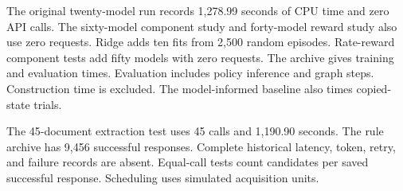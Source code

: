 \label{app:runtime_details}

The original twenty-model run records 1,278.99 seconds of CPU time and
zero API calls. The sixty-model component study and forty-model reward
study also use zero requests. Ridge adds ten fits from 2,500 random
episodes. Rate-reward component tests add fifty models with zero requests.
The archive gives training and evaluation times. Evaluation includes
policy inference and graph steps. Construction time is excluded.
The model-informed baseline also times copied-state trials.

The 45-document extraction test uses 45 calls and 1,190.90 seconds.
The rule archive has 9,456 successful responses. Complete historical
latency, token, retry, and failure records are absent.
Equal-call tests count candidates per saved successful response.
Scheduling uses simulated acquisition units.
